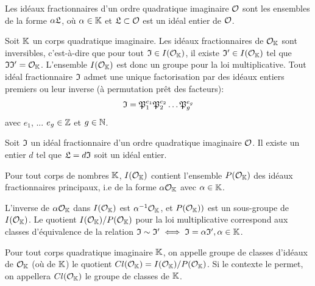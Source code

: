 \begin{Prop}
	
	Les idéaux fractionnaires d'un ordre quadratique imaginaire $\mathcal{O}$ sont les ensembles de la forme $\alpha\mathfrak{L}$, où $\alpha\in\mathbb{K}$ et $\mathfrak{L}\subset\mathcal{O}$ est un idéal entier de $\mathcal{O}$.
\end{Prop}

\begin{Prop}
	 
	Soit $\mathbb{K}$ un corps quadratique imaginaire. Les idéaux fractionnaires de $\mathcal{O}_{\mathbb{K}}$ sont inversibles, c'est-à-dire que pour tout $\mathfrak{I}\in I(\mathcal{O}_{\mathbb{K}})$, il existe $\mathfrak{I}'\in I(\mathcal{O}_{\mathbb{K}})$ tel que $\mathfrak{I}\mathfrak{I}' = \mathcal{O}_{\mathbb{K}}$. L'ensemble $I(\mathcal{O}_{\mathbb{K}})$ est donc un groupe pour la loi multiplicative. 
	Tout idéal fractionnaire $\mathfrak{I}$ admet une unique factorisation par des idéaux entiers premiers ou leur inverse (à permutation prêt des facteurs):
	\begin{equation*}
		\mathfrak{I} = \mathfrak{P}_{1}^{e_{1}}\mathfrak{P}_{2}^{e_{2}}\ldots\mathfrak{P}_{g}^{e_{g}}
	\end{equation*}
	avec $e_{1}$, ... $e_{g}\in\mathbb{Z}$ et $g\in\mathbb{N}$.
\end{Prop}

\begin{Prop}\label{denomid}
	
	Soit $\mathfrak{I}$ un idéal fractionnaire d'un ordre quadratique imaginaire $\mathcal{O}$. Il existe un entier $d$ tel que $\mathfrak{L} = d\mathfrak{I}$ soit un idéal entier. 
\end{Prop}


\begin{Def}
	Pour tout corps de nombres $\mathbb{K}$, $I(\mathcal{O}_{\mathbb{K}})$ contient l'ensemble $P(\mathcal{O}_{\mathbb{K}})$ des idéaux fractionnaires principaux, i.e de la forme $\alpha\mathcal{O}_{\mathbb{K}}$ avec $\alpha\in\mathbb{K}$. 
\end{Def} 

\begin{Rem}
	L'inverse de $\alpha\mathcal{O}_{\mathbb{K}}$ dans $I(\mathcal{O}_{\mathbb{K}})$ est $\alpha^{-1}\mathcal{O}_{\mathbb{K}}$, et $P(\mathcal{O}_{\mathbb{K}}))$ est un sous-groupe de $I(\mathcal{O}_{\mathbb{K}})$. Le quotient $I(\mathcal{O}_{\mathbb{K}})/P(\mathcal{O}_{\mathbb{K}})$ pour la loi multiplicative correspond aux classes d'équivalence de la relation $\mathfrak{I}\sim\mathfrak{I}'\iff\mathfrak{I} = \alpha\mathfrak{I}',\alpha\in\mathbb{K}$.
\end{Rem}

\begin{Def}
	Pour tout corps quadratique imaginaire $\mathbb{K}$, on appelle groupe de classes d'idéaux de $\mathcal{O}_{\mathbb{K}}$ (où de $\mathbb{K}$) le quotient $Cl(\mathcal{O}_{\mathbb{K}}) =  I(\mathcal{O}_{\mathbb{K}})/P(\mathcal{O}_{\mathbb{K}})$. Si le contexte le permet, on appellera $Cl(\mathcal{O}_{\mathbb{K}})$ le groupe de classes de $\mathbb{K}$. 
\end{Def}


